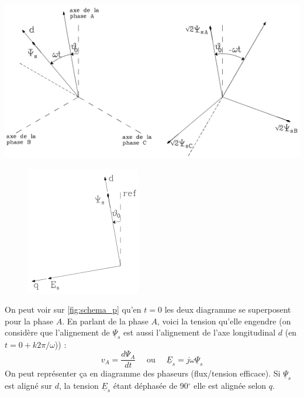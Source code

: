 		\begin{center}
		\includegraphics[scale=0.4]{ch7/image2.png}
		\label{fig:schema_p}
		\end{center}
		\newpage
		
		\begin{figure}
		\includegraphics[scale=0.5]{ch7/image3.png}
		\end{figure}	
		On peut voir sur \autoref{fig:schema_p} qu'en $t=0$ les deux diagramme se 
		superposent pour la phase $A$. En parlant de la phase $A$, voici la tension 
		qu'elle engendre (on considère que l'alignement de $\underline{\Psi}_s$ est 
		aussi l’alignement de l'axe longitudinal $d$ (en $t=0+k2\pi/\omega$)) :
		\begin{equation}
		v_A = \dfrac{d\Psi_A}{dt}\quad \text{ ou }\quad \underline{E}_s = j\omega
		\underline{\Psi}_s
		\end{equation}
		On peut représenter ça en diagramme des phaseurs (flux/tension efficace). Si 
		$\underline{\Psi}_s$ est aligné sur $d$, la tension $\underline{E}_s$ étant 
		déphasée de 90$^\circ$ elle est alignée selon $q$.\\
		
